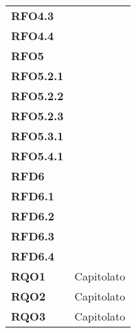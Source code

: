 \begin{longtable}[H]{| >{\centering\bfseries}m{8cm} | >{\centering\arraybackslash}m{8cm} |}
    RFO4.3
    & \\

    RFO4.4
    & \\

    RFO5
    & \\

    RFO5.2.1
    & \\

    RFO5.2.2
    & \\

    RFO5.2.3
    & \\

    RFO5.3.1
    & \\

    RFO5.4.1
    & \\

    RFD6
    & \\

    RFD6.1
    & \\

    RFD6.2
    & \\

    RFD6.3
    & \\

    RFD6.4
    & \\

    RQO1
    & Capitolato \\

    RQO2
    & Capitolato \\

    RQO3
    & Capitolato \\


\end{longtable}
